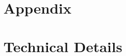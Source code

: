 \documentclass[12pt]{article}
\newcommand{\NW}[1]{{\textcolor{blue}{#1}}}
\begin{document}
%








\newpage
\bigskip
%


\pagebreak
\section*{Appendix}
\appendix{}
\setcounter{equation}{0}
\renewcommand{\theequation}{A-\arabic{equation}}
\setcounter{section}{0}
\renewcommand{\thesection}{\Alph{section}}
\renewcommand{\thesubsection}{\Alph{section}.\arabic{subsection}}
\setcounter{figure}{0}
\renewcommand{\thefigure}{A-\arabic{figure}}
\setcounter{footnote}{0}
\renewcommand{\thefootnote}{A-\arabic{footnote}}
\bigskip%


\section{Technical Details} \label{appendix:A}
\end{document}
